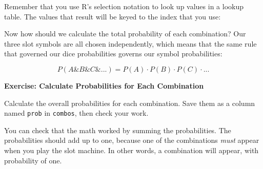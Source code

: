 \documentclass[
  letterpaper,
  DIV=11,
  numbers=noendperiod]{scrbook}
\newenvironment{Shaded}{\begin{snugshade}}{\end{snugshade}}
\newcommand{\DecValTok}[1]{\textcolor[rgb]{0.68,0.00,0.00}{#1}}
\newcommand{\DocumentationTok}[1]{\textcolor[rgb]{0.37,0.37,0.37}{\textit{#1}}}
\newcommand{\FunctionTok}[1]{\textcolor[rgb]{0.28,0.35,0.67}{#1}}
\newcommand{\NormalTok}[1]{\textcolor[rgb]{0.00,0.23,0.31}{#1}}
\newcommand{\OtherTok}[1]{\textcolor[rgb]{0.00,0.23,0.31}{#1}}
\newcommand{\SpecialCharTok}[1]{\textcolor[rgb]{0.37,0.37,0.37}{#1}}
\begin{document}
Remember that you use R's selection notation to look up values in a
lookup table. The values that result will be keyed to the index that you
use:

\begin{Shaded}
\end{Shaded}

Now how should we calculate the total probability of each combination?
Our three slot symbols are all chosen independently, which means that
the same rule that governed our dice probabilities governs our symbol
probabilities:

\[
P(A \& B \& C \& ...) = P(A) \cdot P(B) \cdot P(C) \cdot ...
\]

\begin{tcolorbox}[enhanced jigsaw, left=2mm, breakable, colback=white, colframe=quarto-callout-color-frame, leftrule=.75mm, bottomrule=.15mm, arc=.35mm, opacityback=0, rightrule=.15mm, toprule=.15mm]

\vspace{-3mm}\textbf{Exercise: Calculate Probabilities for Each Combination}\vspace{3mm}

Calculate the overall probabilities for each combination. Save them as a
column named \texttt{prob} in \texttt{combos}, then check your work.

You can check that the math worked by summing the probabilities. The
probabilities should add up to one, because one of the combinations
\emph{must} appear when you play the slot machine. In other words, a
combination will appear, with probability of one.

\end{tcolorbox}
\end{document}

